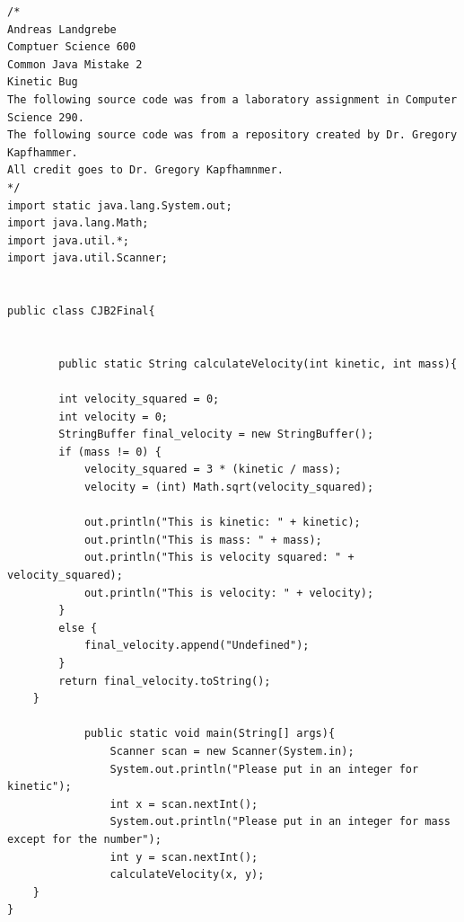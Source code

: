 \begin{lstlisting}
/*
Andreas Landgrebe
Comptuer Science 600
Common Java Mistake 2
Kinetic Bug
The following source code was from a laboratory assignment in Computer Science 290.
The following source code was from a repository created by Dr. Gregory Kapfhammer.
All credit goes to Dr. Gregory Kapfhamnmer.
*/
import static java.lang.System.out;
import java.lang.Math;
import java.util.*;
import java.util.Scanner;


public class CJB2Final{


		public static String calculateVelocity(int kinetic, int mass){

		int velocity_squared = 0;
		int velocity = 0;
		StringBuffer final_velocity = new StringBuffer();
		if (mass != 0) {
			velocity_squared = 3 * (kinetic / mass);
			velocity = (int) Math.sqrt(velocity_squared);

			out.println("This is kinetic: " + kinetic);
			out.println("This is mass: " + mass);
			out.println("This is velocity squared: " + velocity_squared);
			out.println("This is velocity: " + velocity);
		}
		else {
			final_velocity.append("Undefined");
		}
		return final_velocity.toString();
	}

			public static void main(String[] args){
				Scanner scan = new Scanner(System.in);
				System.out.println("Please put in an integer for kinetic");
				int x = scan.nextInt();
				System.out.println("Please put in an integer for mass except for the number");
				int y = scan.nextInt();
				calculateVelocity(x, y);
	}
}

\end{lstlisting}


